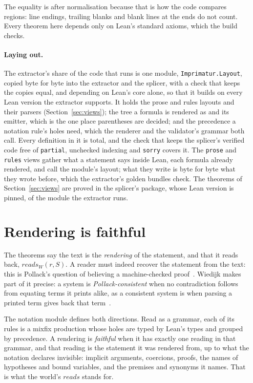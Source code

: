 \documentclass[acmsmall,screen,review,anonymous,nonacm]{acmart}
\begin{document}
The equality is after normalisation because that is how the code compares
regions: line endings, trailing blanks and blank lines at the ends do not
count. Every theorem here depends only on Lean's standard axioms, which the
build checks.

\paragraph{Laying out.} The extractor's share of the code that runs is one
module, \texttt{Imprimatur.Layout}, copied byte for byte into the extractor
and the splicer, with a check that keeps the copies equal, and depending on
Lean's core alone, so that it builds on every Lean version the extractor
supports. It holds the prose and rules layouts and their parsers
(Section~\ref{sec:views}); the tree a formula is rendered as and its
emitter, which is the one place parentheses are decided; and the precedence
a notation rule's holes need, which the renderer and the validator's grammar
both call. Every definition in it is total, and the check that keeps the
splicer's verified code free of \texttt{partial}, unchecked indexing and
\texttt{sorry} covers it. The \verb|prose| and \verb|rules| views gather
what a statement says inside Lean, each formula already rendered, and call
the module's layout; what they write is byte for byte what they wrote
before, which the extractor's golden bundles check. The theorems of
Section~\ref{sec:views} are proved in the splicer's package, whose Lean
version is pinned, of the module the extractor runs.

\section{Rendering is faithful}
\label{sec:faithful}

The theorems say the text is the \emph{rendering} of the statement, and
that it reads back, $\mathit{reads}_{W}(r, S)$. A reader must indeed
recover the statement from the text: this is Pollack's question of
believing a machine-checked proof~\cite{Pollack98}. Wiedijk makes part of
it precise: a system is \emph{Pollack-consistent} when no contradiction
follows from equating terms it prints alike, as a consistent system is
when parsing a printed term gives back that term~\cite{Wiedijk12}.

The notation module defines both directions. Read as a grammar, each of its
rules is a mixfix production whose holes are typed by Lean's types and
grouped by precedence. A rendering is \emph{faithful} when it has exactly
one reading in that grammar, and that reading is the statement it was
rendered from, up to what the notation declares invisible: implicit
arguments, coercions, proofs, the names of hypotheses and bound variables,
and the premises and synonyms it names. That is what the world's
$\mathit{reads}$ stands for.
\end{document}
